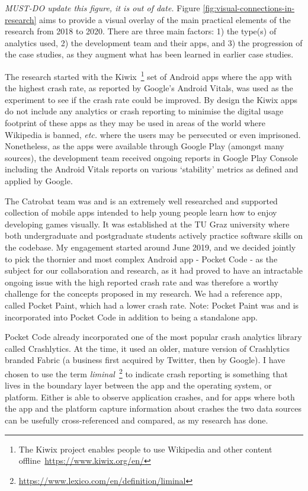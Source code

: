 \textit{MUST-DO update this figure, it is out of date.} Figure \ref{fig:visual-connections-in-research}  aims to provide a visual overlay of the main practical elements of the research from 2018 to 2020. There are three main factors: 1) the type(s) of analytics used, 2) the development team and their apps, and 3) the progression of the case studies, as they augment what has been learned in earlier case studies.

The research started with the Kiwix~\footnote{The Kiwix project enables people to use Wikipedia and other content offline~\url{https://www.kiwix.org/en/}} set of Android apps where the app with the highest crash rate, as reported by Google's Android Vitals, was used as the experiment to see if the crash rate could be improved. By design the Kiwix apps do not include any analytics or crash reporting to minimise the digital usage footprint of these apps as they may be used in areas of the world where Wikipedia is banned, \emph{etc.} where the users may be persecuted or even imprisoned. Nonetheless, as the apps were available through Google Play (amongst many sources), the development team received ongoing reports in Google Play Console including the Android Vitals reports on various `stability' metrics as defined and applied by Google.

The Catrobat team was and is an extremely well researched and supported collection of mobile apps intended to help young people learn how to enjoy developing games visually. It was established %
at the TU Graz university where both undergraduate and postgraduate students actively practice software skills on the codebase. My engagement started around June 2019, and we decided jointly to pick the thornier and most complex Android app - Pocket Code - as the subject for our collaboration and research, as it had proved to have an intractable ongoing issue with the high reported crash rate and was therefore a worthy challenge for the concepts proposed in my research. We had a reference app, called Pocket Paint, which had a lower crash rate. Note: Pocket Paint was and is incorporated into Pocket Code in addition to being a standalone app.

Pocket Code already incorporated one of the most popular crash analytics library called Crashlytics. At the time, it used an older, mature version of Crashlytics branded Fabric (a business first acquired by Twitter, then by Google). I have chosen to use the term \emph{liminal}~\footnote{\url{https://www.lexico.com/en/definition/liminal}} to indicate crash reporting is something that lives in the boundary layer between the app and the operating system, or platform. Either is able to observe application crashes, and for apps where both the app and the platform capture information about crashes the two data sources can be usefully cross-referenced and compared, as my research has done.

